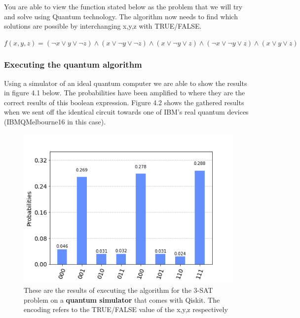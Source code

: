 You are able to view the function stated below as the problem that we will try and solve using Quantum technology. The algorithm now needs to find which solutions are possible by interchanging x,y,z with TRUE/FALSE.

$ f(x,y,z) = (\neg x \vee y \vee \neg z) \wedge  ( x \vee \neg y \vee \neg z) \wedge ( x \vee \neg y \vee  z) \wedge (\neg x \vee \neg y \vee z) \wedge  ( x \vee y \vee  z)	 $
				 
\subsubsection{Executing the quantum algorithm}				 

Using a simulator of an ideal quantum computer we are able to show the results in figure 4.1 below. The probabilities have been amplified to where they are the correct results of this boolean expression. Figure 4.2 shows the gathered results when we sent off the identical circuit towards one of IBM's real quantum devices (IBMQMelbourne16 in this case). 

\begin{figure}[h]
	\centering
	\includegraphics[scale = 0.75]{../Demonstration/img/simulated_3SAT.PNG}
	\caption{These are the results of executing the algorithm for the 3-SAT problem on a \textbf{quantum simulator} that comes with Qiskit. The encoding refers to the TRUE/FALSE value of the x,y,z respectively}
\end{figure}


